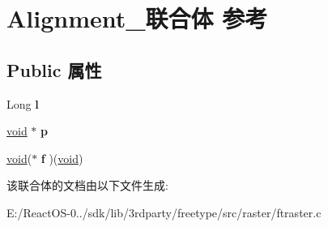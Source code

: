 \hypertarget{union_alignment__}{}\section{Alignment\+\_\+联合体 参考}
\label{union_alignment__}
\subsection*{Public 属性}
\begin{DoxyCompactItemize}
\item 
\mbox{\label{union_alignment___af54aa113ef97001ace792d354192edea}} 
Long {\bfseries l}
\item 
\mbox{\label{union_alignment___a1b4ee27d099055fe4f3ecfe1ecfa6ff2}} 
\hyperlink{interfacevoid}{void} $\ast$ {\bfseries p}
\item 
\mbox{\label{union_alignment___a620e1f14ecf4142e5e78fa1fd92e9e09}} 
\hyperlink{interfacevoid}{void}($\ast$ {\bfseries f} )(\hyperlink{interfacevoid}{void})
\end{DoxyCompactItemize}


该联合体的文档由以下文件生成\+:\begin{DoxyCompactItemize}
\item 
E\+:/\+React\+O\+S-\/0../sdk/lib/3rdparty/freetype/src/raster/ftraster.\+c\end{DoxyCompactItemize}

